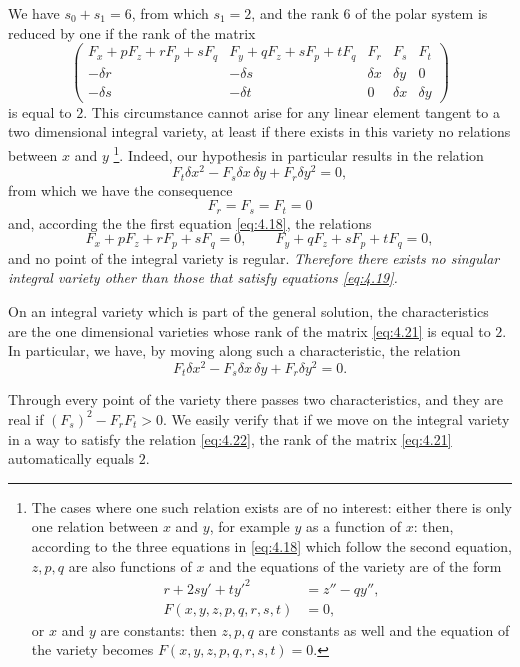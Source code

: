 \documentclass[leqno,11pt]{book}
\numberwithin{equation}{chapter}
\theoremstyle{shape1}
\theoremstyle{shape0}
\theoremstyle{shape2}
\theoremstyle{definition}
\begin{document}
We have $s_{0}+s_{1}=6$, from which $s_{1}=2$, and the rank $6$ of the polar system is reduced by one if the rank of the matrix
\begin{equation}
  \label{eq:4.21}
  \begin{pmatrix}
    F_{x}+pF_{z}+rF_{p}+sF_{q}& F_{y}+qF_{z}+sF_{p}+tF_{q}& F_{r}& F_{s}& F_{t}\\
-\delta r&-\delta s&\delta x&\delta y&0\\
-\delta s&-\delta t& 0&\delta x&\delta y
  \end{pmatrix}
\end{equation}
is equal to $2$. This circumstance cannot arise for any  linear element tangent to a two dimensional integral variety, at least if there exists in this variety no relations between $x$ and $y$ \footnote{The cases where one such relation exists are of no interest: either there is only one relation between $x$ and $y$, for example $y$ as a function of $x$: then, according to the three equations in \eqref{eq:4.18} which follow the second equation, $z,p,q$ are also functions of $x$ and the equations of the variety are of the form
  \begin{align*}
    r+2sy'+ty'^{2}&=z''-qy'',\\
    F(x,y,z,p,q,r,s,t)&=0,
  \end{align*}
  or $x$ and $y$ are constants: then $z,p,q$ are constants as well and the equation of the variety becomes $F(x,y,z,p,q,r,s,t)=0$.
}. Indeed, our hypothesis in particular results in the relation
\[
F_{t}\delta x^{2}-F_{s}\delta x\,\delta y+F_{r}\delta y^{2}=0,
\]
from which we have the consequence
\[
F_{r}=F_{s}=F_{t}=0
\]
and, according the the first equation \eqref{eq:4.18}, the relations
\[
F_{x}+pF_{z}+rF_{p}+sF_{q}=0,\qquad F_{y}+q F_{z}+sF_{p}+tF_{q}=0,
\]
and no point of the integral variety is regular. \emph{Therefore there exists no singular integral variety other than those that satisfy equations \eqref{eq:4.19}.}

On an integral variety which is part of the general solution, the characteristics are the one dimensional varieties whose rank of the matrix \eqref{eq:4.21} is equal to $2$. In particular, we have, by moving along such a characteristic, the relation
\begin{equation}
  \label{eq:4.22}
  F_{t}\delta x^{2}-F_{s}\delta x\,\delta y+F_{r}\delta y^{2}=0.
\end{equation}

Through every point of the variety there passes two characteristics, and they are real if $(F_{s})^{2}-F_{r}F_{t}>0$. We easily verify that if we move on the integral variety in a way to satisfy the relation \eqref{eq:4.22}, the rank of the matrix \eqref{eq:4.21} automatically equals $2$.
\end{document}
